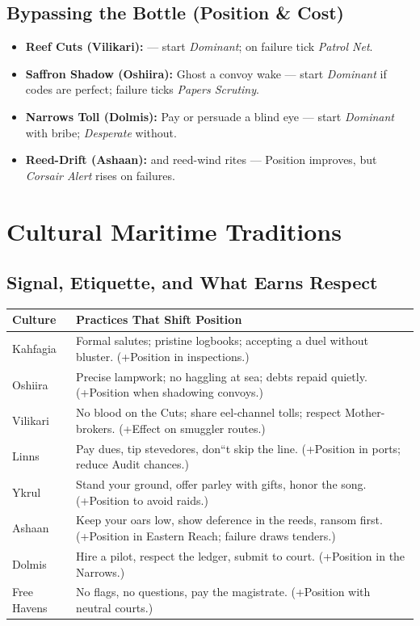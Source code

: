 \documentclass[11pt,oneside]{book}
\newcommand{\tagpill}[1]{\begingroup
  \setlength{\fboxsep}{1pt}\color{black}\fbox{\footnotesize\textsf{#1}}
\endgroup}
\begin{document}
\subsection*{Bypassing the Bottle (Position \& Cost)}
\begin{itemize}
  \item \textbf{Reef Cuts (Vilikari):} \tagpill{LOW-DRAFT} \tagpill{HIDDEN HOLD} --- start \textit{Dominant}; on failure tick \textit{Patrol Net}.
  \item \textbf{Saffron Shadow (Oshiira):} Ghost a convoy wake --- start \textit{Dominant} if codes are perfect; failure ticks \textit{Papers Scrutiny}.
  \item \textbf{Narrows Toll (Dolmis):} Pay or persuade a blind eye --- start \textit{Dominant} with bribe; \textit{Desperate} without.
  \item \textbf{Reed-Drift (Ashaan):} \tagpill{SILENT RIG} and reed-wind rites --- Position improves, but \textit{Corsair Alert} rises on failures.
\end{itemize}

\section{Cultural Maritime Traditions}
\subsection*{Signal, Etiquette, and What Earns Respect}
\begin{tabularx}{\linewidth}{@{}p{3.2cm} X@{}}
\toprule
\textbf{Culture} & \textbf{Practices That Shift Position}\\
\midrule
Kahfagia & Formal salutes; pristine logbooks; accepting a duel without bluster. (+Position in inspections.)\\
Oshiira & Precise lampwork; no haggling at sea; debts repaid quietly. (+Position when shadowing convoys.)\\
Vilikari & No blood on the Cuts; share eel-channel tolls; respect Mother-brokers. (+Effect on smuggler routes.)\\
Linns & Pay dues, tip stevedores, don``t skip the line. (+Position in ports; reduce Audit chances.)\\
Ykrul & Stand your ground, offer parley with gifts, honor the song. (+Position to avoid raids.)\\
Ashaan & Keep your oars low, show deference in the reeds, ransom first. (+Position in Eastern Reach; failure draws tenders.)\\
Dolmis & Hire a pilot, respect the ledger, submit to court. (+Position in the Narrows.)\\
Free Havens & No flags, no questions, pay the magistrate. (+Position with neutral courts.)\\
\bottomrule
\end{tabularx}
\end{document}
